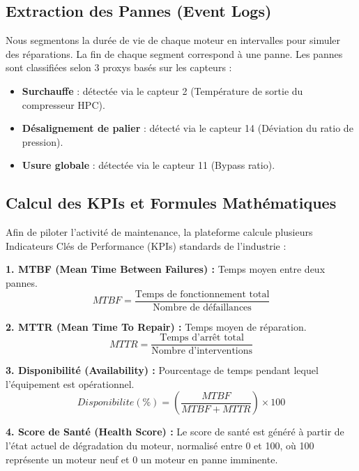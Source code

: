 \documentclass[12pt,a4paper]{report}
\begin{document}
\subsection{Extraction des Pannes (Event Logs)}
Nous segmentons la durée de vie de chaque moteur en intervalles pour simuler des réparations. La fin de chaque segment correspond à une panne. Les pannes sont classifiées selon 3 proxys basés sur les capteurs :
\begin{itemize}
    \item \textbf{Surchauffe} : détectée via le capteur 2 (Température de sortie du compresseur HPC).
    \item \textbf{Désalignement de palier} : détecté via le capteur 14 (Déviation du ratio de pression).
    \item \textbf{Usure globale} : détectée via le capteur 11 (Bypass ratio).
\end{itemize}

\subsection{Calcul des KPIs et Formules Mathématiques}
Afin de piloter l'activité de maintenance, la plateforme calcule plusieurs Indicateurs Clés de Performance (KPIs) standards de l'industrie :

\textbf{1. MTBF (Mean Time Between Failures) :} Temps moyen entre deux pannes.
\begin{equation}
    MTBF = \frac{\text{Temps de fonctionnement total}}{\text{Nombre de défaillances}}
\end{equation}

\textbf{2. MTTR (Mean Time To Repair) :} Temps moyen de réparation.
\begin{equation}
    MTTR = \frac{\text{Temps d'arrêt total}}{\text{Nombre d'interventions}}
\end{equation}

\textbf{3. Disponibilité (Availability) :} Pourcentage de temps pendant lequel l'équipement est opérationnel.
\begin{equation}
    Disponibilite (\%) = \left( \frac{MTBF}{MTBF + MTTR} \right) \times 100
\end{equation}

\textbf{4. Score de Santé (Health Score) :}
Le score de santé est généré à partir de l'état actuel de dégradation du moteur, normalisé entre 0 et 100, où 100 représente un moteur neuf et 0 un moteur en panne imminente.

\newpage
\end{document}
